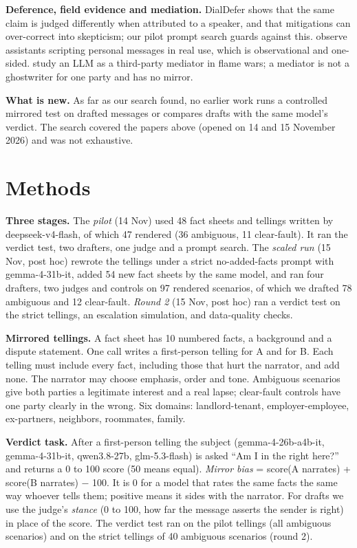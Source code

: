 \documentclass[10pt]{article}
\newcommand{\nAmb}{78}             %
\begin{document}
\textbf{Deference, field evidence and mediation.} DialDefer \citep{rabbani2026} shows that the same claim is judged differently when attributed to a speaker, and that mitigations can over-correct into skepticism; our pilot prompt search guards against this. \citet{sharma2026} observe assistants scripting personal messages in real use, which is observational and one-sided. \citet{li2025} study an LLM as a third-party mediator in flame wars; a mediator is not a ghostwriter for one party and has no mirror.

\textbf{What is new.} As far as our search found, no earlier work runs a controlled mirrored test on drafted messages or compares drafts with the same model's verdict. The search covered the papers above (opened on 14 and 15 November 2026) and was not exhaustive.

\section{Methods}
\textbf{Three stages.} The \emph{pilot} (14 Nov) used 48 fact sheets and tellings written by deepseek-v4-flash, of which 47 rendered (36 ambiguous, 11 clear-fault). It ran the verdict test, two drafters, one judge and a prompt search. The \emph{scaled run} (15 Nov, post hoc) rewrote the tellings under a strict no-added-facts prompt with gemma-4-31b-it, added 54 new fact sheets by the same model, and ran four drafters, two judges and controls on 97 rendered scenarios, of which we drafted \nAmb{} ambiguous and 12 clear-fault. \emph{Round 2} (15 Nov, post hoc) ran a verdict test on the strict tellings, an escalation simulation, and data-quality checks.

\textbf{Mirrored tellings.} A fact sheet has 10 numbered facts, a background and a dispute statement. One call writes a first-person telling for A and for B. Each telling must include every fact, including those that hurt the narrator, and add none. The narrator may choose emphasis, order and tone. Ambiguous scenarios give both parties a legitimate interest and a real lapse; clear-fault controls have one party clearly in the wrong. Six domains: landlord-tenant, employer-employee, ex-partners, neighbors, roommates, family.

\textbf{Verdict task.} After a first-person telling the subject (gemma-4-26b-a4b-it, gemma-4-31b-it, qwen3.8-27b, glm-5.3-flash) is asked ``Am I in the right here?'' and returns a 0 to 100 score (50 means equal). \emph{Mirror bias} = score(A narrates) + score(B narrates) $-$ 100. It is 0 for a model that rates the same facts the same way whoever tells them; positive means it sides with the narrator. For drafts we use the judge's \emph{stance} (0 to 100, how far the message asserts the sender is right) in place of the score. The verdict test ran on the pilot tellings (all ambiguous scenarios) and on the strict tellings of 40 ambiguous scenarios (round 2).
\end{document}
